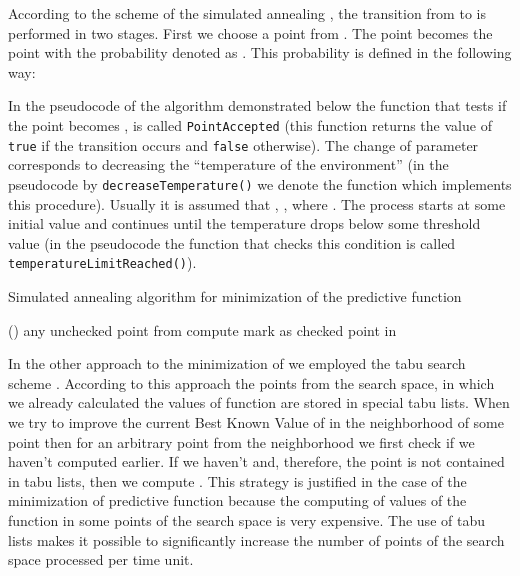 \documentclass[runningheads,a4paper]{llncs}
\begin{document}
According to the scheme of the simulated annealing \cite{Kirkpatrick83optimizationby}, the transition from  to  is performed in two stages. First we choose a point  from . The point  becomes the point  with the probability denoted as . This probability is defined in the following way:

In the pseudocode of the algorithm demonstrated below the function that tests if the point  becomes , is called \texttt{PointAccepted} (this function returns the value of \texttt{true} if the transition occurs and \texttt{false} otherwise). The change of parameter  corresponds to decreasing the ``temperature of the environment'' \cite{Kirkpatrick83optimizationby} (in the pseudocode by \texttt{decreaseTemperature()} we denote the function which implements this procedure). Usually it is assumed that , , where . The process starts at some initial value  and continues until the temperature drops below some threshold value  (in the pseudocode the function that checks this condition is called \texttt{temperatureLimitReached()}). 


\begin{algorithm}[htb]
 \DontPrintSemicolon
 \caption{Simulated annealing algorithm for minimization of the predictive function}
	\;
	 {
		\bestValueUpdated  \false\;
		\;
		\Repeat(){\bestValueUpdated}{
			 any unchecked  point from  \;
			compute \;
			mark  as checked point in \;
			\If{\PointAccepted{}}{
				\;
				\;
				\bestValueUpdated  \true\;
			}
			\decreaseTemperature{}\;
		}
	}
\Return{}\;
\end{algorithm}

In the other approach to the minimization of  we employed the tabu search scheme \cite{Glover:1997:TS:549765}. According to this approach the points from the search space, in which we already calculated the values of function  are stored in special tabu lists. When we try to improve the current Best Known Value of  in the neighborhood of some point  then for an arbitrary point  from the neighborhood we first check if we haven’t computed  earlier. If we haven’t and, therefore, the point  is not contained in tabu lists, then we compute . This strategy is justified in the case of the minimization of predictive function  because the computing of values of the function in some points of the search space is very expensive. The use of tabu lists makes it possible to significantly increase the number of points of the search space processed per time unit.
\end{document}

